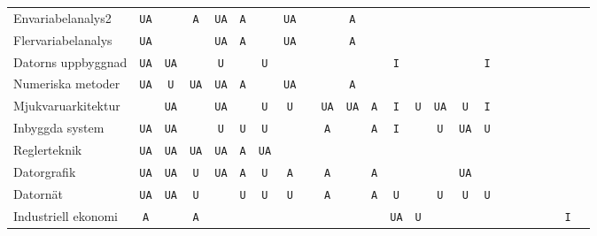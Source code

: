 \begin{sidewaystable}[H]
{\begin{tabular}{lccccccccccccccccccccccc}
Envariabelanalys2                       & \texttt{UA}  &     & \texttt{A}   & \texttt{UA}  & \texttt{A}   &     & \texttt{UA}  &     &     & \texttt{A}   &     &     &     &     &     &     &     &     &     &     &     &     &     \tabularnewline
Flervariabelanalys                       & \texttt{UA}  &     &     & \texttt{UA}  & \texttt{A}   &     & \texttt{UA}  &     &     & \texttt{A}   &     &     &     &     &     &     &     &     &     &     &     &     &     \tabularnewline
Datorns uppbyggnad                       & \texttt{UA}  & \texttt{UA}  &     & \texttt{U}   &     & \texttt{U}   &     &     &     &     &     & \texttt{I}   &     &     &     & \texttt{I}   &     &     &     &     &     &     &     \tabularnewline
\midrule
Numeriska metoder                        & \texttt{UA}  & \texttt{U}   & \texttt{UA}  & \texttt{UA}  & \texttt{A}   &     & \texttt{UA}  &     &     & \texttt{A}   &     &     &     &     &     &     &     &     &     &     &     &     &     \tabularnewline
Mjukvaruarkitektur                       &     & \texttt{UA}  &     & \texttt{UA}  &     & \texttt{U}   & \texttt{U}   &     & \texttt{UA}  & \texttt{UA}  & \texttt{A}   & \texttt{I}   & \texttt{U}   & \texttt{UA}  & \texttt{U}   & \texttt{I}   &     &     &     &     &     &     &     \tabularnewline
Inbyggda system                          & \texttt{UA}  & \texttt{UA}  &     & \texttt{U}   & \texttt{U}   & \texttt{U}   &     &     & \texttt{A}   &     & \texttt{A}   & \texttt{I}   &     & \texttt{U}   & \texttt{UA}  & \texttt{U}   &     &     &     &     &     &     &     \tabularnewline
Reglerteknik                             & \texttt{UA}  & \texttt{UA}  & \texttt{UA}  & \texttt{UA}  & \texttt{A}   & \texttt{UA}  &     &     &     &     &     &     &     &     &     &     &     &     &     &     &     &     &     \tabularnewline
Datorgrafik                              & \texttt{UA}  & \texttt{UA}  & \texttt{U}   & \texttt{UA}  & \texttt{A}   & \texttt{U}   & \texttt{A}   &     & \texttt{A}   &     & \texttt{A}   &     &     &     & \texttt{UA}  &     &     &     &     &     &     &     &     \tabularnewline
Datornät                                 & \texttt{UA}  & \texttt{UA}  & \texttt{U}   &     & \texttt{U}   & \texttt{U}   & \texttt{U}   &     & \texttt{A}   &     & \texttt{A}   & \texttt{U}   &     & \texttt{U}   & \texttt{U}   & \texttt{U}   &     &     &     &     &     &     &     \tabularnewline
Industriell ekonomi    & \texttt{A}   &     & \texttt{A}   &     &     &     &     &     &     &     &     & \texttt{UA}  & \texttt{U}   &     &     &     &     &     &     &     &     & \texttt{I}   &     \tabularnewline

\end{tabular}}
\end{sidewaystable}
